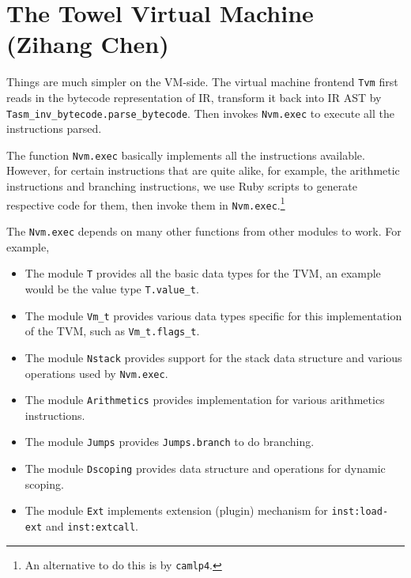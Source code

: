 \documentclass{report}
\newcommand{\inst}[1] {\texttt{inst:#1}}
\begin{document}
\section{The Towel Virtual Machine (Zihang Chen)}

Things are much simpler on the VM-side. The virtual machine frontend \texttt{Tvm} first reads in the bytecode representation of IR, transform it back into IR AST by \texttt{Tasm\_inv\_bytecode.parse\_bytecode}. Then invokes \texttt{Nvm.exec} to execute all the instructions parsed.

The function \texttt{Nvm.exec} basically implements all the instructions available. However, for certain instructions that are quite alike, for example, the arithmetic instructions and branching instructions, we use Ruby scripts to generate respective code for them, then invoke them in \texttt{Nvm.exec}.\footnote{An alternative to do this is by \texttt{camlp4}.}

\begin{mdframed}[style=detail]
The \texttt{Nvm.exec} depends on many other functions from other modules to work. For example,

\begin{itemize}
\item The module \texttt{T} provides all the basic data types for the TVM, an example would be the value type \texttt{T.value\_t}.

\item The module \texttt{Vm\_t} provides various data types specific for this implementation of the TVM, such as \texttt{Vm\_t.flags\_t}.

\item The module \texttt{Nstack} provides support for the stack data
  structure and various operations used by \texttt{Nvm.exec}.

\item The module \texttt{Arithmetics} provides implementation for various arithmetics instructions.

\item The module \texttt{Jumps} provides \texttt{Jumps.branch} to do branching.

\item The module \texttt{Dscoping} provides data structure and operations for dynamic scoping.

\item The module \texttt{Ext} implements extension (plugin) mechanism for \inst{load-ext} and \inst{extcall}.
\end{itemize}
\end{mdframed}
\end{document}

